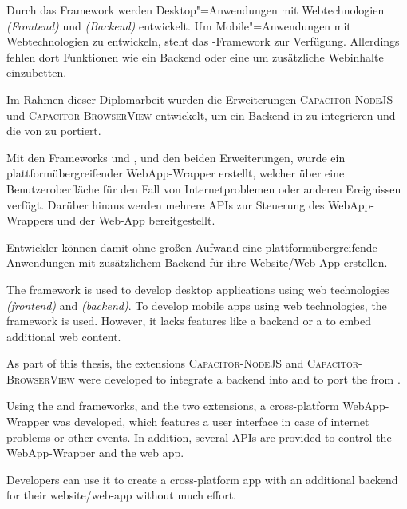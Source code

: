 

Durch das Framework  werden Desktop"=Anwendungen mit Webtechnologien \textit{(Frontend)} und  \textit{(Backend)} entwickelt.
Um Mobile"=Anwendungen mit Webtechnologien zu entwickeln, steht das -Framework zur Verfügung.
Allerdings fehlen dort Funktionen wie ein  Backend oder eine  um zusätzliche Webinhalte einzubetten.

Im Rahmen dieser Diplomarbeit wurden die Erweiterungen \textsc{Capacitor-NodeJS} und \textsc{Capacitor-BrowserView} entwickelt,
um ein  Backend in  zu integrieren und die  von  zu portiert.

Mit den Frameworks  und , und den beiden Erweiterungen, wurde ein plattformübergreifender WebApp-Wrapper erstellt,
welcher über eine Benutzeroberfläche für den Fall von Internetproblemen oder anderen Ereignissen verfügt.
Darüber hinaus werden mehrere APIs zur Steuerung des WebApp-Wrappers und der Web-App bereitgestellt.

Entwickler können damit ohne großen Aufwand eine plattformübergreifende Anwendungen mit zusätzlichem Backend für ihre Website/Web-App erstellen. 


The  framework is used to develop desktop applications using web technologies \textit{(frontend)} and  \textit{(backend)}.
To develop mobile apps using web technologies, the  framework is used.
However, it lacks features like a  backend or a  to embed additional web content.

As part of this thesis, the extensions \textsc{Capacitor-NodeJS} and \textsc{Capacitor-BrowserView} were developed
to integrate a  backend into  and to port the  from .

Using the  and  frameworks, and the two extensions, a cross-platform WebApp-Wrapper was developed,
which features a user interface in case of internet problems or other events.
In addition, several APIs are provided to control the WebApp-Wrapper and the web app.

Developers can use it to create a cross-platform app with an additional backend for their website/web-app without much effort.

\printfn
